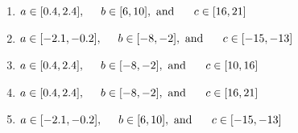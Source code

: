 \documentclass[14pt]{extbook}
\begin{document}
\begin{enumerate}
{\begin{center}
\end{center}
\begin{enumerate}[label=\Alph*.]
\item \( a \in [0.4, 2.4], \hspace*{5mm} b \in [6, 10], \text{ and } \hspace*{5mm} c \in [16, 21] \)
\item \( a \in [-2.1, -0.2], \hspace*{5mm} b \in [-8, -2], \text{ and } \hspace*{5mm} c \in [-15, -13] \)
\item \( a \in [0.4, 2.4], \hspace*{5mm} b \in [-8, -2], \text{ and } \hspace*{5mm} c \in [10, 16] \)
\item \( a \in [0.4, 2.4], \hspace*{5mm} b \in [-8, -2], \text{ and } \hspace*{5mm} c \in [16, 21] \)
\item \( a \in [-2.1, -0.2], \hspace*{5mm} b \in [6, 10], \text{ and } \hspace*{5mm} c \in [-15, -13] \)


\end{enumerate}}
\end{enumerate}
\end{document}
